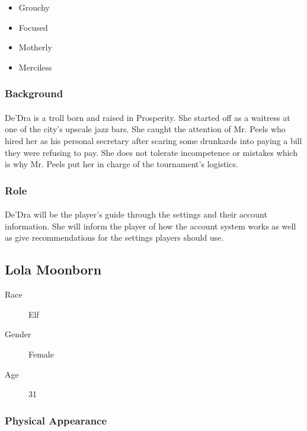 \begin{itemize}
    \item Grouchy
    \item Focused
    \item Motherly
    \item Merciless
\end{itemize}

\subsubsection{Background}

\paragraph{} De'Dra is a troll born and raised in Prosperity. She started off as a waitress at one of the city's upscale jazz bars. She caught the attention of Mr. Peels who hired her as his personal secretary after scaring some drunkards into paying a bill they were refusing to pay. She does not tolerate incompetence or mistakes which is why Mr. Peels put her in charge of the tournament's logistics.

\subsubsection{Role}

\paragraph{} De'Dra will be the player's guide through the settings and their account information. She will inform the player of how the account system works as well as give recommendations for the settings players should use.

\subsection{Lola Moonborn}

\begin{description}
    \item[Race] Elf
    \item[Gender] Female
    \item[Age] 31  
\end{description}

\subsubsection{Physical Appearance}

